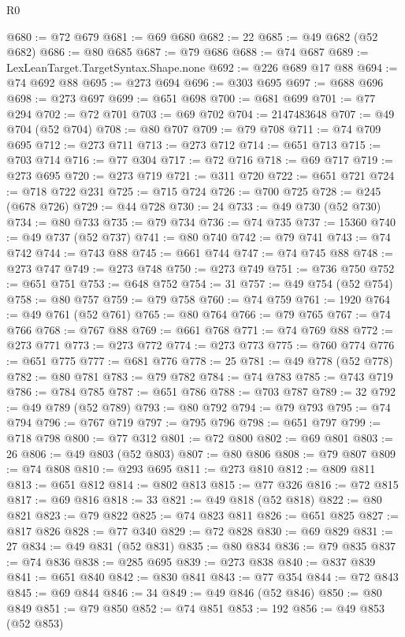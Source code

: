 \begin{lexlean}{R0}
\begin{coremodule}
@680 := @72 @679
@681 := @69 @680
@682 := 22
@685 := @49 @682 (@52 @682)
@686 := @80 @685
@687 := @79 @686
@688 := @74 @687
@689 := LexLeanTarget.TargetSyntax.Shape.none
@692 := @226 @689 @17 @88
@694 := @74 @692 @88
@695 := @273 @694
@696 := @303 @695
@697 := @688 @696
@698 := @273 @697
@699 := @651 @698
@700 := @681 @699
@701 := @77 @294
@702 := @72 @701
@703 := @69 @702
@704 := 2147483648
@707 := @49 @704 (@52 @704)
@708 := @80 @707
@709 := @79 @708
@711 := @74 @709 @695
@712 := @273 @711
@713 := @273 @712
@714 := @651 @713
@715 := @703 @714
@716 := @77 @304
@717 := @72 @716
@718 := @69 @717
@719 := @273 @695
@720 := @273 @719
@721 := @311 @720
@722 := @651 @721
@724 := @718 @722 @231
@725 := @715 @724
@726 := @700 @725
@728 := @245 (@678 @726)
@729 := @44 @728
@730 := 24
@733 := @49 @730 (@52 @730)
@734 := @80 @733
@735 := @79 @734
@736 := @74 @735
@737 := 15360
@740 := @49 @737 (@52 @737)
@741 := @80 @740
@742 := @79 @741
@743 := @74 @742
@744 := @743 @88
@745 := @661 @744
@747 := @74 @745 @88
@748 := @273 @747
@749 := @273 @748
@750 := @273 @749
@751 := @736 @750
@752 := @651 @751
@753 := @648 @752
@754 := 31
@757 := @49 @754 (@52 @754)
@758 := @80 @757
@759 := @79 @758
@760 := @74 @759
@761 := 1920
@764 := @49 @761 (@52 @761)
@765 := @80 @764
@766 := @79 @765
@767 := @74 @766
@768 := @767 @88
@769 := @661 @768
@771 := @74 @769 @88
@772 := @273 @771
@773 := @273 @772
@774 := @273 @773
@775 := @760 @774
@776 := @651 @775
@777 := @681 @776
@778 := 25
@781 := @49 @778 (@52 @778)
@782 := @80 @781
@783 := @79 @782
@784 := @74 @783
@785 := @743 @719
@786 := @784 @785
@787 := @651 @786
@788 := @703 @787
@789 := 32
@792 := @49 @789 (@52 @789)
@793 := @80 @792
@794 := @79 @793
@795 := @74 @794
@796 := @767 @719
@797 := @795 @796
@798 := @651 @797
@799 := @718 @798
@800 := @77 @312
@801 := @72 @800
@802 := @69 @801
@803 := 26
@806 := @49 @803 (@52 @803)
@807 := @80 @806
@808 := @79 @807
@809 := @74 @808
@810 := @293 @695
@811 := @273 @810
@812 := @809 @811
@813 := @651 @812
@814 := @802 @813
@815 := @77 @326
@816 := @72 @815
@817 := @69 @816
@818 := 33
@821 := @49 @818 (@52 @818)
@822 := @80 @821
@823 := @79 @822
@825 := @74 @823 @811
@826 := @651 @825
@827 := @817 @826
@828 := @77 @340
@829 := @72 @828
@830 := @69 @829
@831 := 27
@834 := @49 @831 (@52 @831)
@835 := @80 @834
@836 := @79 @835
@837 := @74 @836
@838 := @285 @695
@839 := @273 @838
@840 := @837 @839
@841 := @651 @840
@842 := @830 @841
@843 := @77 @354
@844 := @72 @843
@845 := @69 @844
@846 := 34
@849 := @49 @846 (@52 @846)
@850 := @80 @849
@851 := @79 @850
@852 := @74 @851
@853 := 192
@856 := @49 @853 (@52 @853)

\end{coremodule}
\end{lexlean}
